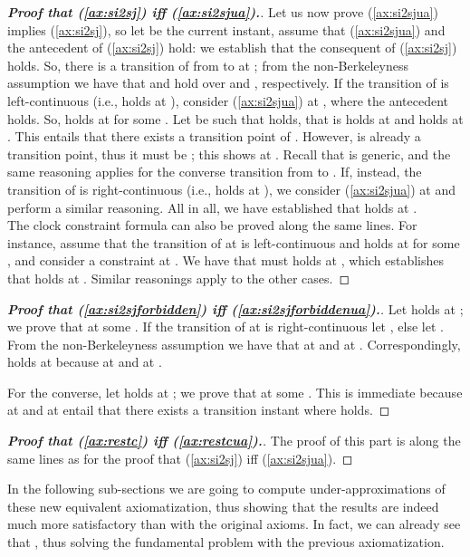 \documentclass[a4paper]{article}
\newcommand{\frf}[1]{(\ref{#1})}
\theoremstyle{plain}
\theoremstyle{definition}
\begin{document}
\begin{proof}[\textbf{Proof that \frf{ax:si2sj} iff \frf{ax:si2sjua}.}]
Let us now prove \frf{ax:si2sjua} implies \frf{ax:si2sj}, so let  be the current instant, assume that \frf{ax:si2sjua} and the antecedent  of \frf{ax:si2sj} hold: we establish that the consequent of \frf{ax:si2sj} holds.
So, there is a transition of  from  to  at ; from the non-Berkeleyness assumption we have that  and  hold over  and , respectively.
If the transition of  is left-continuous (i.e.,  holds at ), consider \frf{ax:si2sjua} at , where the antecedent holds.
So,  holds at  for some .
Let  be such that  holds, that is  holds at  and  holds at .
This entails that there exists a transition point  of .
However,  is already a transition point, thus it must be ; this shows  at .
Recall that  is generic, and the same reasoning applies for the converse transition from  to .
If, instead, the transition of  is right-continuous (i.e.,  holds at ), we consider \frf{ax:si2sjua} at  and perform a similar reasoning.
All in all, we have established that  holds at .\\
The clock constraint formula  can also be proved along the same lines.
For instance, assume that the transition of  at  is left-continuous and  holds at  for some , and consider a constraint  at .
We have that  must holds at , which establishes that  holds at .
Similar reasonings apply to the other cases.
\end{proof}



\begin{proof}[\textbf{Proof that \frf{ax:si2sjforbidden} iff \frf{ax:si2sjforbiddenua}.}]
Let  holds at ; we prove that  at some .
If the transition of  at  is right-continuous let , else let .
From the non-Berkeleyness assumption we have that  at  and  at .
Correspondingly,  holds at  because  at  and  at .

For the converse, let  holds at ; we prove that  at some .
This is immediate because  at  and  at  entail that there exists a transition instant  where  holds.
\end{proof}



\begin{proof}[\textbf{Proof that \frf{ax:restc} iff \frf{ax:restcua}.}]
The proof of this part is along the same lines as for the proof that \frf{ax:si2sj} iff \frf{ax:si2sjua}.
\end{proof}


In the following sub-sections we are going to compute under-approximations of these new equivalent axiomatization, thus showing that the results are indeed much more satisfactory than with the original axioms.
In fact, we can already see that , thus solving the fundamental problem with the previous axiomatization.
\end{document}
